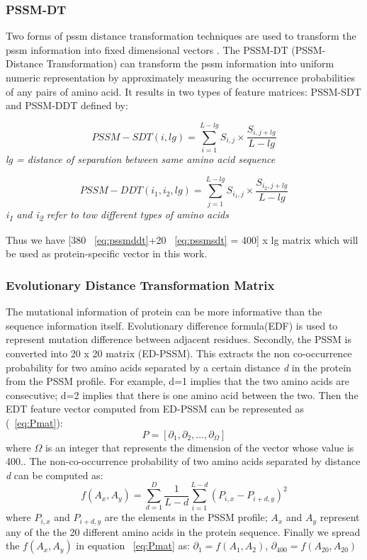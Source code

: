 \subsubsection{PSSM-DT}
Two forms of \acrshort{pssm} distance transformation techniques are used to transform the \acrshort{pssm} information into fixed dimensional vectors \cite{Xu2015}. The PSSM-DT (PSSM-Distance Transformation) can transform the \acrshort{pssm} information into uniform numeric representation by approximately measuring the occurrence probabilities of any pairs of amino acid. It results in two types of feature matrices: PSSM-SDT and PSSM-DDT defined by:

\begin{equation}
  PSSM-SDT(i,lg) = \sum_{i=1}^{L-lg} S_{i,j} \times \frac{ S_{i,j+lg} }{L-lg} 
  \label{eq:pssmsdt}
\end{equation}
\textit{\center lg =  distance of separation between same amino acid sequence}

\begin{equation}
  PSSM-DDT(i_1,i_2, lg) = \sum_{j=1}^{L-lg} S_{i_1,j} \times \frac{ S_{i_2,j+lg} }{ L-lg} 
  \label{eq:pssmddt}
\end{equation}
\textit{\centering i\textsubscript{1} and i\textsubscript{2} refer to tow different types of amino acids}

Thus we have [380 ~\eqref{eq:pssmddt}+20 ~\eqref{eq:pssmsdt} = 400] x lg matrix which will be used as protein-specific vector in this work.

\subsubsection{Evolutionary Distance Transformation Matrix}
The mutational information of protein can be more informative than the sequence information itself\cite{Zhang2014}. Evolutionary difference formula(EDF) is used to represent mutation difference between adjacent residues. Secondly, the PSSM is converted into 20 x 20 matrix (ED-PSSM). This extracts the non co-occurrence probability for two amino acids separated by a certain distance \textit{d} in the protein from the PSSM profile. For example, d=1 implies that the two amino acids are consecutive; d=2 implies that there is one amino acid between the two. Then the EDT feature vector computed from ED-PSSM can be represented as (~\ref{eq:Pmat}): 
\begin{equation}
  \label{eq:Pmat}
  P = [ \partial_1 ,\partial_2, \dots, \partial_\Omega]
\end{equation}
where $\Omega$ is an integer that represents the dimension of the vector whose value is 400.. The non-co-occurrence probability of two amino acids separated by distance \textit{d} can be computed as:
\begin{equation}
  f(A_x,A_y) = \sum_{d=1}^{D} \frac{1}{L-d} \sum_{i=1}^{L-d} (P_{i,x} - P_{i+d,y})^2
  \label{eq:edt}
\end{equation}
where $P_{i,x}$ and $P_{i+d,y}$ are the elements in the PSSM profile; $A_x$ and $A_y$ represent any of the the 20 different amino acids in the protein sequence. Finally we spread the $f(A_x,A_y)$ in equation ~\ref{eq:Pmat} as:
$ \partial_1 = f(A_1,A_2) $, 
$ \partial_{400} = f(A_{20}, A_{20}) $



